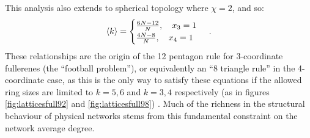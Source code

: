 This analysis also extends to spherical topology where $\chi=2$, and so:
 \begin{equation}
 	\label{eq:2dsphericalcases}
	\langle k \rangle = \begin{cases}
		\frac{6N-12}{N}, \quad x_3 = 1 \\
		\frac{4N-8}{N}, \quad x_4 = 1
	\end{cases}\,.
\end{equation}
These relationships are the origin of the 12 pentagon rule for 3-coordinate fullerenes (the ``football problem''), or equivalently an ``8 triangle rule'' in the 4-coordinate case, as this is the only way to satisfy these equations if the allowed ring sizes are limited to $k=5,6$ and $k=3,4$ respectively (as in figures \ref{fig:latticesfull92} and \ref{fig:latticesfull98}) \cite{Fowler1996}.
Much of the richness in the structural behaviour of \td{} physical networks stems from this fundamental constraint on the network average degree.

